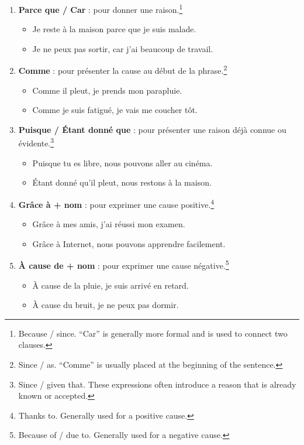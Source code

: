 \documentclass[math,code]{amznotes}
\theoremstyle{remark}
\begin{document}
\begin{enumerate}
    \item \textbf{Parce que / Car} : pour donner une raison.\footnote{Because / since. ``Car'' is generally more formal and is used to connect two clauses.}
    \begin{itemize}
        \item Je reste à la maison parce que je suis malade.
        \item Je ne peux pas sortir, car j'ai beaucoup de travail.
    \end{itemize}

    \item \textbf{Comme} : pour présenter la cause au début de la phrase.\footnote{Since / as. ``Comme'' is usually placed at the beginning of the sentence.}
    \begin{itemize}
        \item Comme il pleut, je prends mon parapluie.
        \item Comme je suis fatigué, je vais me coucher tôt.
    \end{itemize}

    \item \textbf{Puisque / Étant donné que} : pour présenter une raison déjà connue ou évidente.\footnote{Since / given that. These expressions often introduce a reason that is already known or accepted.}
    \begin{itemize}
        \item Puisque tu es libre, nous pouvons aller au cinéma.
        \item Étant donné qu'il pleut, nous restons à la maison.
    \end{itemize}

    \item \textbf{Grâce à + nom} : pour exprimer une cause positive.\footnote{Thanks to. Generally used for a positive cause.}
    \begin{itemize}
        \item Grâce à mes amis, j'ai réussi mon examen.
        \item Grâce à Internet, nous pouvons apprendre facilement.
    \end{itemize}

    \item \textbf{À cause de + nom} : pour exprimer une cause négative.\footnote{Because of / due to. Generally used for a negative cause.}
    \begin{itemize}
        \item À cause de la pluie, je suis arrivé en retard.
        \item À cause du bruit, je ne peux pas dormir.
    \end{itemize}
\end{enumerate}
\end{document}
